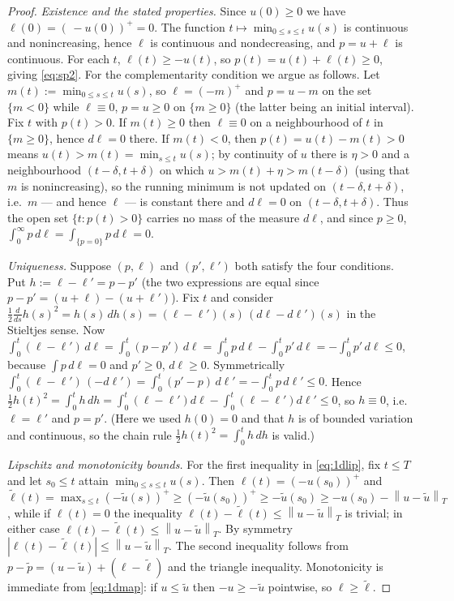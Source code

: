 \documentclass{amsart}
\theoremstyle{definition}
\theoremstyle{remark}
\newcommand{\norm}[1]{\left\lVert#1\right\rVert}
\begin{document}
\begin{proof}
\emph{Existence and the stated properties.} Since $u(0)\ge0$ we have
$\ell(0)=(\,{-}u(0))^+=0$. The function $t\mapsto\min_{0\le s\le t}u(s)$ is
continuous and nonincreasing, hence $\ell$ is continuous and nondecreasing, and
$p=u+\ell$ is continuous. For each $t$, $\ell(t)\ge -u(t)$, so
$p(t)=u(t)+\ell(t)\ge0$, giving \eqref{eq:sp2}. For the complementarity
condition we argue as follows. Let $m(t):=\min_{0\le s\le t}u(s)$, so
$\ell=(-m)^+$ and $p=u-m$ on the set $\{m<0\}$ while $\ell\equiv0$,
$p=u\ge0$ on $\{m\ge0\}$ (the latter being an initial interval). Fix $t$ with
$p(t)>0$. If $m(t)\ge0$ then $\ell\equiv0$ on a neighbourhood of $t$ in
$\{m\ge0\}$, hence $d\ell=0$ there. If $m(t)<0$, then $p(t)=u(t)-m(t)>0$ means
$u(t)>m(t)=\min_{s\le t}u(s)$; by continuity of $u$ there is
$\eta>0$ and a neighbourhood $(t-\delta,t+\delta)$ on which
$u>m(t)+\eta>m(t-\delta)$ (using that $m$ is nonincreasing), so the running
minimum is not updated on $(t-\delta,t+\delta)$, i.e.\ $m$ — and hence $\ell$
— is constant there and $d\ell=0$ on $(t-\delta,t+\delta)$. Thus the open set
$\{t:p(t)>0\}$ carries no mass of the measure $d\ell$, and since $p\ge0$,
$\int_0^\infty p\,d\ell=\int_{\{p=0\}}p\,d\ell=0$.

\emph{Uniqueness.} Suppose $(p,\ell)$ and $(p',\ell')$ both satisfy the four
conditions. Put $h:=\ell-\ell'=p-p'$ (the two expressions are equal since
$p-p'=(u+\ell)-(u+\ell')$). Fix $t$ and consider
$\tfrac12\frac{d}{ds}h(s)^2=h(s)\,dh(s)=(\ell-\ell')(s)\,(d\ell-d\ell')(s)$ in
the Stieltjes sense. Now
$\int_0^t(\ell-\ell')\,d\ell=\int_0^t(p-p')\,d\ell
=\int_0^t p\,d\ell-\int_0^t p'\,d\ell=-\int_0^t p'\,d\ell\le 0$,
because $\int p\,d\ell=0$ and $p'\ge0$, $d\ell\ge0$. Symmetrically
$\int_0^t(\ell-\ell')\,(-d\ell')=\int_0^t(p'-p)\,d\ell'
=-\int_0^t p\,d\ell'\le0$. Hence
$\tfrac12 h(t)^2=\int_0^t h\,dh
=\int_0^t(\ell-\ell')d\ell-\int_0^t(\ell-\ell')d\ell'\le 0$, so $h\equiv0$,
i.e.\ $\ell=\ell'$ and $p=p'$. (Here we used $h(0)=0$ and that $h$ is of
bounded variation and continuous, so the chain rule
$\tfrac12 h(t)^2=\int_0^t h\,dh$ is valid.)

\emph{Lipschitz and monotonicity bounds.} For the first inequality in
\eqref{eq:1dlip}, fix $t\le T$ and let $s_0\le t$ attain
$\min_{0\le s\le t}u(s)$. Then
$\ell(t)=(-u(s_0))^+$ and
$\tilde\ell(t)=\max_{s\le t}(-\tilde u(s))^+\ge(-\tilde u(s_0))^+
\ge -\tilde u(s_0)\ge -u(s_0)-\norm{u-\tilde u}_T$, while if $\ell(t)=0$ the
inequality $\ell(t)-\tilde\ell(t)\le \norm{u-\tilde u}_T$ is trivial; in either
case $\ell(t)-\tilde\ell(t)\le \norm{u-\tilde u}_T$. By symmetry
$|\ell(t)-\tilde\ell(t)|\le\norm{u-\tilde u}_T$. The second inequality follows
from $p-\tilde p=(u-\tilde u)+(\ell-\tilde\ell)$ and the triangle inequality.
Monotonicity is immediate from \eqref{eq:1dmap}: if $u\le\tilde u$ then
$-u\ge-\tilde u$ pointwise, so $\ell\ge\tilde\ell$.
\end{proof}
\end{document}
